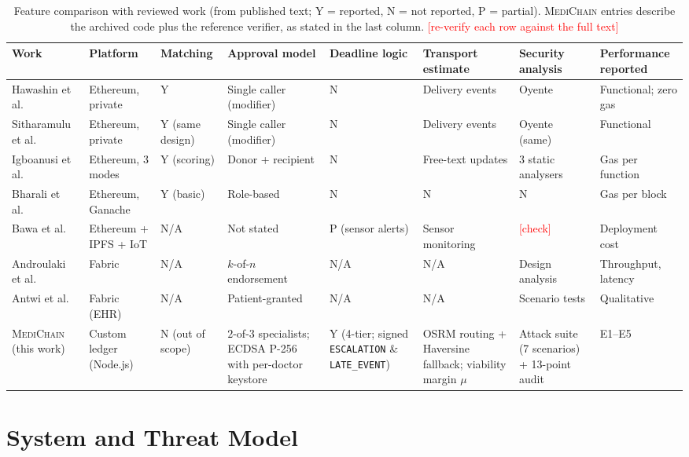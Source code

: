 \documentclass[journal]{IEEEtran}
\newcommand{\todo}[1]{\textcolor{red}{[#1]}}
\newcommand{\mc}{\textsc{MediChain}}
\begin{document}
\begin{table}[t]
\centering
\caption{Feature comparison with reviewed work (from published text; Y = reported, N = not reported, P = partial). \mc{} entries describe the archived code plus the reference verifier, as stated in the last column. \todo{re-verify each row against the full text}}
\label{tab:lit}
\footnotesize
\setlength{\tabcolsep}{3pt}
\begin{tabular}{@{}p{2.5cm}p{2.1cm}p{1.8cm}p{2.4cm}p{1.9cm}p{2.0cm}p{2.1cm}p{2.1cm}@{}}
\toprule
Work & Platform & Matching & Approval model & Deadline logic & Transport estimate & Security analysis & Performance reported \\
\midrule
Hawashin et al.\ \cite{hawashin2022} & Ethereum, private & Y & Single caller (modifier) & N & Delivery events & Oyente & Functional; zero gas \\
Sitharamulu et al.\ \cite{sitharamulu2024} & Ethereum, private & Y (same design) & Single caller (modifier) & N & Delivery events & Oyente (same) & Functional \\
Igboanusi et al.\ \cite{boms2024} & Ethereum, 3 modes & Y (scoring) & Donor + recipient & N & Free-text updates & 3 static analysers & Gas per function \\
Bharali et al.\ \cite{bharali2026} & Ethereum, Ganache & Y (basic) & Role-based & N & N & N & Gas per block \\
Bawa et al.\ \cite{iot2025} & Ethereum + IPFS + IoT & N/A & Not stated & P (sensor alerts) & Sensor monitoring & \todo{check} & Deployment cost \\
Androulaki et al.\ \cite{fabric2018} & Fabric & N/A & $k$-of-$n$ endorsement & N/A & N/A & Design analysis & Throughput, latency \\
Antwi et al.\ \cite{antwi2021} & Fabric (EHR) & N/A & Patient-granted & N/A & N/A & Scenario tests & Qualitative \\
\midrule
\mc{} (this work) & Custom ledger (Node.js) & N (out of scope) & $2$-of-$3$ specialists; ECDSA P-256 with per-doctor keystore & Y (4-tier; signed \texttt{ESCALATION} \& \texttt{LATE\_EVENT}) & OSRM routing + Haversine fallback; viability margin $\mu$ & Attack suite (7 scenarios) + 13-point audit & E1--E5 \\
\bottomrule
\end{tabular}
\end{table}

\section{System and Threat Model}\label{sec:model}
\end{document}
